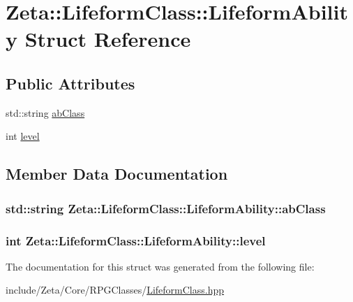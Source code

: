 \hypertarget{structZeta_1_1LifeformClass_1_1LifeformAbility}{\section{Zeta\+:\+:Lifeform\+Class\+:\+:Lifeform\+Ability Struct Reference}
\label{structZeta_1_1LifeformClass_1_1LifeformAbility}
}
\subsection*{Public Attributes}
\begin{DoxyCompactItemize}
\item 
std\+::string \hyperlink{structZeta_1_1LifeformClass_1_1LifeformAbility_adfd286b664fd5536f77e18e82e5029fe}{ab\+Class}
\item 
int \hyperlink{structZeta_1_1LifeformClass_1_1LifeformAbility_ab495901a7579f59da5082639f4816b1d}{level}
\end{DoxyCompactItemize}


\subsection{Member Data Documentation}
\hypertarget{structZeta_1_1LifeformClass_1_1LifeformAbility_adfd286b664fd5536f77e18e82e5029fe}{
\subsubsection[{ab\+Class}]{\setlength{\rightskip}{0pt plus 5cm}std\+::string Zeta\+::\+Lifeform\+Class\+::\+Lifeform\+Ability\+::ab\+Class}}\label{structZeta_1_1LifeformClass_1_1LifeformAbility_adfd286b664fd5536f77e18e82e5029fe}
\hypertarget{structZeta_1_1LifeformClass_1_1LifeformAbility_ab495901a7579f59da5082639f4816b1d}{
\subsubsection[{level}]{\setlength{\rightskip}{0pt plus 5cm}int Zeta\+::\+Lifeform\+Class\+::\+Lifeform\+Ability\+::level}}\label{structZeta_1_1LifeformClass_1_1LifeformAbility_ab495901a7579f59da5082639f4816b1d}


The documentation for this struct was generated from the following file\+:\begin{DoxyCompactItemize}
\item 
include/\+Zeta/\+Core/\+R\+P\+G\+Classes/\hyperlink{LifeformClass_8hpp}{Lifeform\+Class.\+hpp}\end{DoxyCompactItemize}
